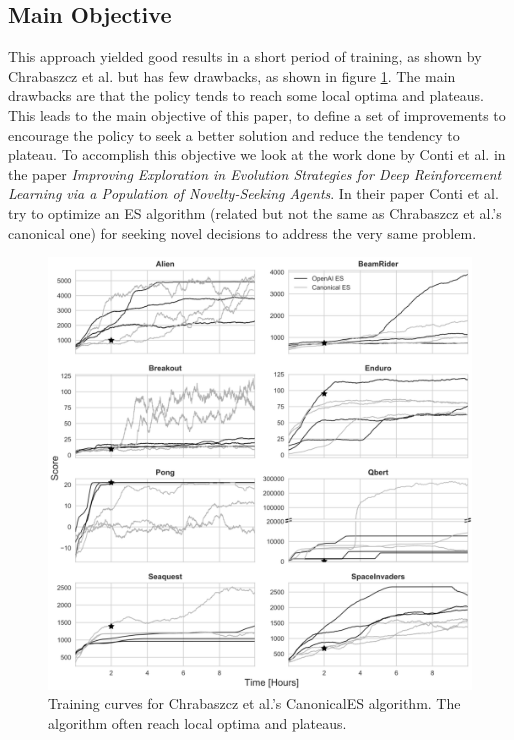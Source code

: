 \documentclass[11 pt, twocolumn]{article}
\begin{document}
\subsection{Main Objective}
This approach yielded good results in a short period of training, as shown by Chrabaszcz et al. but has few drawbacks, as shown in figure \ref{fig:canonical_results}. The main drawbacks are that the policy tends to reach some local optima and plateaus. This leads to the main objective of this paper, to define a set of improvements to encourage the policy to seek a better solution and reduce the tendency to plateau. To accomplish this objective we look at the work done by Conti et al. \cite{improveES} in the paper \emph{Improving Exploration in Evolution Strategies for Deep Reinforcement Learning via a Population of Novelty-Seeking Agents}. In their paper Conti et al. try to optimize an ES algorithm (related but not the same as Chrabaszcz et al.'s canonical one) for seeking novel decisions to address the very same problem.

\begin{figure}[h!]
  \includegraphics[width=\linewidth]{canonical_train_res.png}
  \caption{Training curves for Chrabaszcz et al.'s CanonicalES algorithm. The algorithm often reach local optima and plateaus.}
  \label{fig:canonical_results}
\end{figure}
\end{document}

